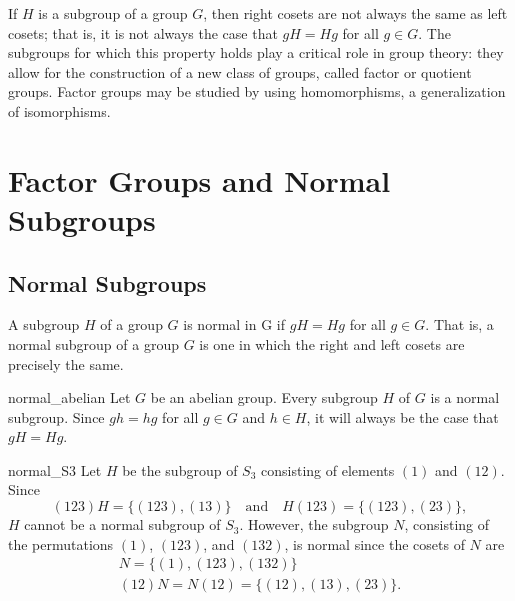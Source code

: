 

If $H$ is a subgroup of a group $G$, then right cosets are not always the same as left cosets; that is, it is not always the case that $gH = Hg$ for all $g \in G$.  The subgroups for which this property holds play a critical role in group theory: they allow for the construction of a new class of groups, called factor or quotient groups.  Factor groups may be studied by using homomorphisms, a generalization of isomorphisms. 
 

\section{Factor Groups and Normal Subgroups}
 
\subsection*{Normal Subgroups}

A subgroup $H$ of a group $G$ is {\bfi
normal\/} in G if $gH =
Hg$ for all $g \in G$. That is, a normal subgroup of a group $G$ is
one in which the right and left cosets are precisely the same. 
 
\begin{example}{normal_abelian}
Let $G$ be an abelian group. Every subgroup $H$ of $G$ is a normal
subgroup.  Since $gh = hg$ for all $g \in G$ and $h \in H$, it will
always be the case that $gH = Hg$. 
\end{example}
 
\begin{example}{normal_S3}
Let $H$ be the subgroup of $S_3$ consisting of elements $(1)$ and
$(12)$. Since 
\[
(123) H = \{ (123), (13) \}
\quad
\text{and}
\quad
H (123) = \{ (123), (23) \},
\]
$H$ cannot be a normal subgroup of $S_3$.  However, the subgroup $N$,
consisting of the permutations $(1)$, $(123)$, and $(132)$, is normal
since the cosets of $N$ are 
\[
\begin{array}{c}
N  =   \{ (1), (123), (132) \} \\
(12) N =  N (12)  =  \{ (12), (13), (23) \}.
\end{array}
\]
\end{example}
 
